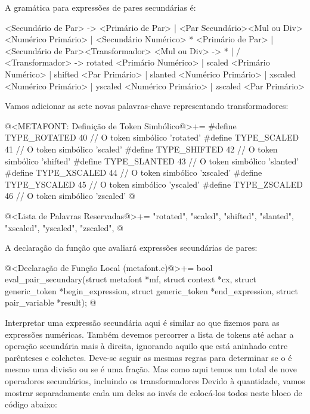 
A gramática para expressões de pares secundárias é:

\alinhaverbatim
<Secundário de Par> -> <Primário de Par> |
                       <Par Secundário><Mul ou Div><Numérico Primário> |
                       <Secundário Numérico> * <Primário de Par> |
                       <Secundário de Par><Transformador>
<Mul ou Div> -> * | /
<Transformador> -> rotated <Primário Numérico> |
                   scaled <Primário Numérico> |
                   shifted <Par Primário> |
                   slanted <Numérico Primário> |
                   xscaled <Numérico Primário> |
                   yscaled <Numérico Primário> |
                   zscaled <Par Primário>
\alinhanormal

Vamos adicionar as sete novas palavras-chave representando
transformadores:

\iniciocodigo
@<METAFONT: Definição de Token Simbólico@>+=
#define TYPE_ROTATED  40 // O token simbólico 'rotated'
#define TYPE_SCALED   41 // O token simbólico 'scaled'
#define TYPE_SHIFTED  42 // O token simbólico 'shifted'
#define TYPE_SLANTED  43 // O token simbólico 'slanted'
#define TYPE_XSCALED  44 // O token simbólico 'xscaled'
#define TYPE_YSCALED  45 // O token simbólico 'yscaled'
#define TYPE_ZSCALED  46 // O token simbólico 'zscaled'
@
\fimcodigo

\iniciocodigo
@<Lista de Palavras Reservadas@>+=
"rotated", "scaled", "shifted", "slanted", "xscaled", "yscaled",
"zscaled",
@
\fimcodigo

A declaração da função que avaliará expressões secundárias de pares:

\iniciocodigo
@<Declaração de Função Local (metafont.c)@>+=
bool eval_pair_secundary(struct metafont *mf, struct context *cx,
                         struct generic_token *begin_expression,
                         struct generic_token *end_expression,
                         struct pair_variable *result);
@
\fimcodigo


Interpretar uma expressão secundária aqui é similar ao que fizemos
para as expressões numéricas. Também devemos percorrer a lista de
tokens até achar a operação secundária mais à direita, ignorando
aquilo que está aninhado entre parênteses e colchetes. Deve-se seguir
as mesmas regras para determinar se o \monoespaco{/} é mesmo uma
divisão ou se é uma fração. Mas como aqui temos um total de nove
operadores secundários, incluindo os transformadores Devido à
quantidade, vamos mostrar separadamente cada um deles ao invés de
colocá-los todos neste bloco de código abaixo:

